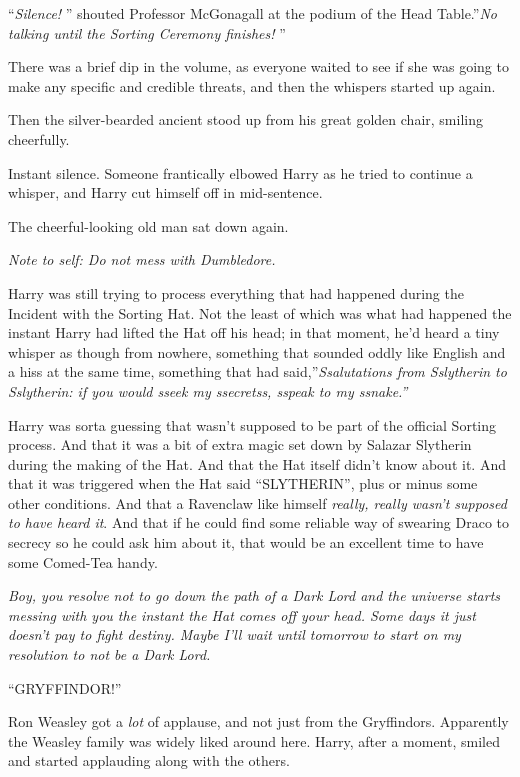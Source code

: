 ``\emph{Silence!} '' shouted Professor McGonagall at the podium of the
Head Table.''\emph{No talking until the Sorting Ceremony finishes!} ''

There was a brief dip in the volume, as everyone waited to see if she
was going to make any specific and credible threats, and then the
whispers started up again.

Then the silver-bearded ancient stood up from his great golden chair,
smiling cheerfully.

Instant silence. Someone frantically elbowed Harry as he tried to
continue a whisper, and Harry cut himself off in mid-sentence.

The cheerful-looking old man sat down again.

\emph{Note to self: Do not mess with Dumbledore.}

Harry was still trying to process everything that had happened during
the Incident with the Sorting Hat. Not the least of which was what had
happened the instant Harry had lifted the Hat off his head; in that
moment, he'd heard a tiny whisper as though from nowhere, something that
sounded oddly like English and a hiss at the same time, something that
had said,''\emph{Ssalutations from Sslytherin to Sslytherin: if you
would sseek my ssecretss, sspeak to my ssnake.''}

Harry was sorta guessing that wasn't supposed to be part of the official
Sorting process. And that it was a bit of extra magic set down by
Salazar Slytherin during the making of the Hat. And that the Hat itself
didn't know about it. And that it was triggered when the Hat said
``SLYTHERIN'', plus or minus some other conditions. And that a Ravenclaw
like himself \emph{really, really wasn't supposed to have heard it}. And
that if he could find some reliable way of swearing Draco to secrecy so
he could ask him about it, that would be an excellent time to have some
Comed-Tea handy.

\emph{Boy, you resolve not to go down the path of a Dark Lord and the
universe starts messing with you the instant the Hat comes off your
head. Some days it just doesn't pay to fight destiny. Maybe I'll wait
until tomorrow to start on my resolution to not be a Dark Lord.}

``GRYFFINDOR!''

Ron Weasley got a \emph{lot} of applause, and not just from the
Gryffindors. Apparently the Weasley family was widely liked around here.
Harry, after a moment, smiled and started applauding along with the
others.

